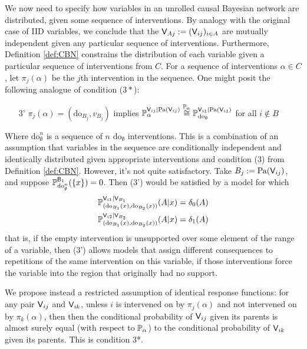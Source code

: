 We now need to specify how variables in an unrolled causal Bayesian network are distributed, given some sequence of interventions. By analogy with the original case of IID variables, we conclude that the $\mathsf{V}_{Aj}:=(\mathsf{V}_{ij})_{i\in A}$ are mutually independent given any particular sequence of interventions. Furthermore, Definition \ref{def:CBN} constrains the distribution of each variable given a particular sequence of interventions from $C$. For a sequence of interventions $\alpha\in C$, let $\pi_j(\alpha)$ be the $j$th intervention in the sequence. One might posit the following analogue of condition ($3*$): 
\begin{itemize}
    \item [3'] $\pi_j(\alpha)=(\mathrm{do}_{B_j},v_{B_j})$ implies $\mathbb{P}_{\alpha}^{\mathsf{V}_{ij}|\mathrm{Pa}(\mathsf{V}_{ij})}\overset{\mathbb{P}_{\alpha}}{\cong}\mathbb{P}_{\mathrm{do}_{\emptyset}}^{\mathsf{V}_{i1}|\mathrm{Pa}(\mathsf{V}_{i1})}$ for all $i\not\in B$
\end{itemize}
Where $\mathrm{do}_{\emptyset}^n$ is a sequence of $n$ $\mathrm{do}_{\emptyset}$ interventions. This is a combination of an assumption that variables in the sequence are conditionally independent and identically distributed given appropriate interventions and condition (3) from Definition \ref{def:CBN}. However, it's not quite satisfactory. Take $B_j:=\mathrm{Pa}(\mathsf{V}_{ij})$, and suppose $\mathbb{P}_{\mathrm{do}_{\emptyset}^n}^{\mathsf{B}_{1}}(\{x\})=0$. Then (3') would be satisfied by a model for which
\begin{align}
    \mathbb{P}_{(\mathrm{do}_{B_1}(x),\mathrm{do}_{B_2}(x))}^{\mathsf{V}_{i1}|\mathsf{V}_{B_1}}(A|x) &= \delta_0(A)\\
    \mathbb{P}_{(\mathrm{do}_{B_1}(x),\mathrm{do}_{B_2}(x))}^{\mathsf{V}_{i2}|\mathsf{V}_{B_2}}(A|x) &= \delta_1(A)
\end{align}
that is, if the empty intervention is unsupported over some element of the range of a variable, then (3') allows models that assign different consequences to repetitions of the same intervention on this variable, if those interventions force the variable into the region that originally had no support.

We propose instead a restricted assumption of identical response functions: for any pair $\mathsf{V}_{ij}$ and $\mathsf{V}_{ik}$, unless $i$ is intervened on by $\pi_j(\alpha)$ and not intervened on by $\pi_{k}(\alpha)$, then then the conditional probability of $\mathsf{V}_{ij}$ given its parents is almost surely equal (with respect to $\mathbb{P}_\alpha$) to the conditional probability of $\mathsf{V}_{ik}$ given its parents. This is condition 3*.

